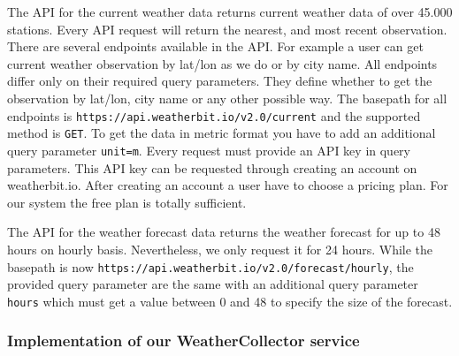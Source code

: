 The API for the current weather data returns current weather data of over 45.000 stations.
Every API request will return the nearest, and most recent observation.
There are several endpoints available in the API.
For example a user can get current weather observation by lat/lon as we do or by city name.
All endpoints differ only on their required query parameters.
They define whether to get the observation by lat/lon, city name or any other possible way.
The basepath for all endpoints is \texttt{https://api.weatherbit.io/v2.0/current} and the supported method is \texttt{GET}.
To get the data in metric format you have to add an additional query parameter \texttt{unit=m}.
Every request must provide an API key in query parameters.\cite{weatherbit}
This API key can be requested through creating an account on weatherbit.io.
After creating an account a user have to choose a pricing plan.
For our system the free plan is totally sufficient.

The API for the weather forecast data returns the weather forecast for up to 48 hours on hourly basis.
Nevertheless, we only request it for 24 hours.
While the basepath is now \texttt{https://api.weatherbit.io/v2.0/forecast/hourly}, the provided query parameter are the same with an additional query parameter \texttt{hours} which must get a value between 0 and 48 to specify the size of the forecast.

\subsubsection{Implementation of our WeatherCollector service}\label{sec:weathercollector}





